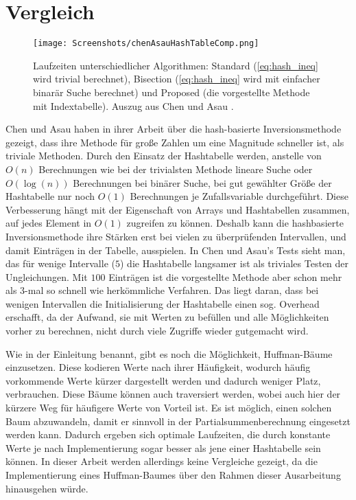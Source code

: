 \section{Vergleich}
\begin{figure}
    \centering
    \texttt{[image: Screenshots/chenAsauHashTableComp.png]}
    \caption{Laufzeiten unterschiedlicher Algorithmen: Standard (\eqref{eq:hash_ineq} 
        wird trivial berechnet), Bisection (\eqref{eq:hash_ineq} wird mit einfacher 
        binarär Suche berechnet) und Proposed (die vorgestellte Methode mit 
        Indextabelle). Auszug aus Chen und Asau \cite{chen_asau-generating_random_variates-1974}.}
    \label{fig:computationTimeComp}
\end{figure}
Chen und Asau haben in ihrer Arbeit über die hash-basierte Inversionsmethode 
gezeigt, dass ihre Methode für große Zahlen um eine Magnitude schneller ist, 
als triviale Methoden. Durch den Einsatz der Hashtabelle werden, anstelle von 
$O(n)$ Berechnungen wie bei der trivialsten Methode lineare Suche oder $O(\log
(n))$ Berechnungen bei binärer Suche, bei gut gewählter Größe der Hashtabelle 
nur noch $O(1)$ Berechnungen je Zufallsvariable durchgeführt. Diese Verbesserung 
hängt mit der 
Eigenschaft von Arrays und Hashtabellen zusammen, auf jedes Element in $O(1)$ 
zugreifen zu können. Deshalb kann die hashbasierte Inversionsmethode ihre 
Stärken erst bei vielen zu überprüfenden Intervallen, und damit Einträgen in 
der Tabelle, ausspielen. In Chen und Asau's Tests sieht man, das für wenige 
Intervalle ($5$) die Hashtabelle langsamer ist als triviales Testen der 
Ungleichungen. Mit $100$ Einträgen ist die vorgestellte Methode aber schon mehr 
als $3$-mal so schnell wie herkömmliche Verfahren. Das liegt daran, dass bei 
wenigen Intervallen die Initialisierung der Hashtabelle einen sog. Overhead 
erschafft, da der Aufwand, sie mit Werten zu befüllen und alle Möglichkeiten 
vorher zu berechnen, nicht durch viele Zugriffe wieder gutgemacht wird.

Wie in der Einleitung benannt, gibt es noch die Möglichkeit, Huffman-Bäume 
einzusetzen. Diese kodieren Werte nach ihrer Häufigkeit, wodurch häufig 
vorkommende Werte kürzer dargestellt werden und dadurch weniger Platz, verbrauchen. 
Diese Bäume können auch traversiert werden, wobei auch hier der kürzere Weg für 
häufigere Werte von Vorteil ist. Es ist möglich, einen solchen Baum abzuwandeln, 
damit er sinnvoll in der Partialsummenberechnung eingesetzt werden kann. Dadurch 
ergeben sich optimale Laufzeiten, die durch konstante Werte je nach Implementierung 
sogar besser als jene einer Hashtabelle sein können. In dieser Arbeit werden 
allerdings keine Vergleiche gezeigt, da die Implementierung eines Huffman-Baumes 
über den Rahmen dieser Ausarbeitung hinausgehen würde.

